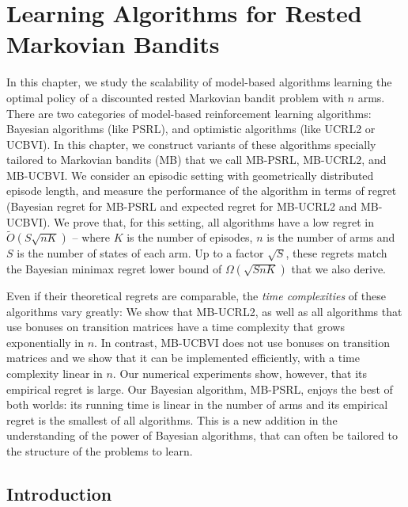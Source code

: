 \begingroup

\let\clearpage\relax

\chapter{Learning Algorithms for Rested Markovian Bandits}
\label{ch:learning_rested}

In this chapter, we study the scalability of model-based algorithms learning the optimal policy of a discounted rested Markovian bandit  problem with $n$ arms. There are two categories of model-based reinforcement learning algorithms: Bayesian algorithms (like PSRL), and optimistic algorithms (like UCRL2 or UCBVI). %
In this chapter, we construct variants of these algorithms specially tailored to Markovian bandits (MB) that we call MB-PSRL, MB-UCRL2, and MB-UCBVI. We consider an episodic setting with geometrically distributed episode length, and measure the performance of the algorithm in terms of regret (Bayesian regret for MB-PSRL and expected regret for MB-UCRL2 and MB-UCBVI). We prove that, for this setting, all algorithms have a low regret in $\tilde{O}(S\sqrt{nK})$ -- where $K$ is the number of episodes, $n$ is the number of arms and $S$ is the number of states of each arm. Up to a factor $\sqrt{S}$, these regrets match the Bayesian minimax regret lower bound of $\Omega(\sqrt{SnK})$ that we also derive.

Even if their theoretical regrets are comparable, the \emph{time complexities} of these  algorithms vary greatly: We show that MB-UCRL2, as well as all  algorithms that use bonuses on transition matrices have a { time} complexity  that grows  exponentially in $n$. In contrast, MB-UCBVI does not use bonuses on transition matrices and we show that  it can be implemented efficiently, with a time complexity linear in $n$. Our numerical experiments show, however, that its empirical regret is large. Our Bayesian algorithm, MB-PSRL, enjoys the best of both worlds: its running time is linear in the number of arms and its empirical regret is the smallest of all algorithms.
This is a new addition in the understanding of the power of Bayesian algorithms, that can often be  tailored to the structure of the problems to learn.

\section{Introduction}
\label{sec:intro}


